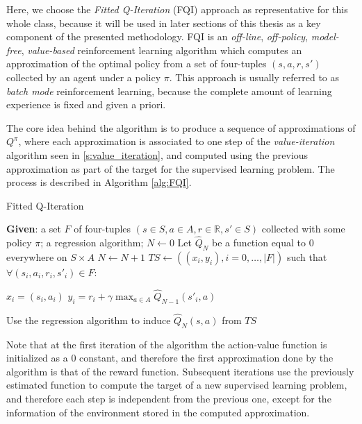 Here, we choose the \textit{Fitted Q-Iteration} (FQI) \cite{ernst2005tree} 
approach as representative for this whole class, because it will be used in 
later sections of this thesis as a key component of the presented methodology.
FQI is an \textit{off-line}, \textit{off-policy}, \textit{model-free}, 
\textit{value-based} reinforcement learning algorithm which computes an 
approximation of the optimal policy from a set of four-tuples $(s, a, r, s')$
collected by an agent under a policy $\pi$.
This approach is usually referred to as \textit{batch mode} reinforcement 
learning, because the complete amount of learning experience is fixed and given
a priori.

The core idea behind the algorithm is to produce a sequence of approximations of
$Q^\pi$, where each approximation is associated to one step of the 
\textit{value-iteration} algorithm seen in \ref{s:value_iteration}, and computed
using the previous approximation as part of the target for the supervised 
learning problem. The process is described in Algorithm \ref{alg:FQI}.
%
\begin{algorithm}[h]
    \caption{Fitted Q-Iteration}
    \label{alg:FQI}
    \begin{algorithmic}
        \STATE \textbf{Given}: a set $F$ of four-tuples $(s \in S, a \in A, r \in \mathbb{R}, s' \in S)$ collected with some policy $\pi$; a regression algorithm;
        \STATE $N \leftarrow 0$
        \STATE Let $\hat{Q}_N$ be a function equal to $0$ everywhere on $S \times A$
        \REPEAT
	    \STATE $N \leftarrow N+1$
	    \STATE $TS \leftarrow ((x_i, y_i), i = 0, \dots, |F|)$ such that $\forall (s_i, a_i, r_i, s'_i) \in F$:
		\begin{ALC@g}
		\STATE $x_i = (s_i, a_i)$
		\STATE $y_i = r_i + \gamma \max_{a \in A} \hat{Q}_{N-1} (s'_i, a)$
		\end{ALC@g}
	    \STATE Use the regression algorithm to induce $\hat{Q}_N(s, a)$ from $TS$
    \end{algorithmic}
\end{algorithm}
%

Note that at the first iteration of the algorithm the action-value function is
initialized as a $0$ constant, and therefore the first approximation done by the 
algorithm is that of the reward function.
Subsequent iterations use the previously estimated function to compute the 
target of a new supervised learning problem, and therefore each step is 
independent from the previous one, except for the information of the environment 
stored in the computed approximation. 

